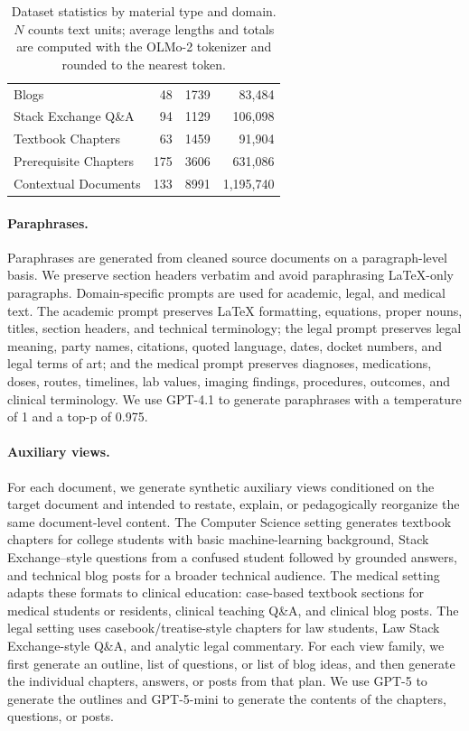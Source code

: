 \begin{table}[t]
\begin{tabular}{@{}lrrr@{}}
Blogs & 48 & 1739 & 83{,}484 \\
Stack Exchange Q\&A & 94 & 1129 & 106{,}098 \\
Textbook Chapters & 63 & 1459 & 91{,}904 \\
Prerequisite Chapters & 175 & 3606 & 631{,}086 \\
Contextual Documents & 133 & 8991 & 1{,}195{,}740 \\
\bottomrule
\end{tabular}
\caption{Dataset statistics by material type and domain. $N$ counts text units; average lengths and totals are computed with the OLMo-2 tokenizer and rounded to the nearest token.}
\label{tab:dataset_artifact_inventory}
\end{table}

\paragraph{Paraphrases.}
Paraphrases are generated from cleaned source documents on a paragraph-level basis.  We preserve section headers verbatim and avoid paraphrasing LaTeX-only paragraphs. Domain-specific prompts are used for academic, legal, and medical text.  The academic prompt preserves LaTeX formatting, equations, proper nouns, titles, section headers, and technical terminology; the legal prompt preserves legal meaning, party names, citations, quoted language, dates, docket numbers, and legal terms of art; and the medical prompt preserves diagnoses, medications, doses, routes, timelines, lab values, imaging findings, procedures, outcomes, and clinical terminology. We use GPT-4.1 to generate paraphrases with a temperature of 1 and a top-p of 0.975.

\paragraph{Auxiliary views.}
For each document, we generate synthetic auxiliary views conditioned on the target document and intended to restate, explain, or pedagogically reorganize the same document-level content.  The Computer Science setting generates textbook chapters for college students with basic machine-learning background, Stack Exchange--style questions from a confused student followed by grounded answers, and technical blog posts for a broader technical audience.  The medical setting adapts these formats to clinical education: case-based textbook sections for medical students or residents, clinical teaching Q\&A, and clinical blog posts.  The legal setting uses casebook/treatise-style chapters for law students, Law Stack Exchange-style Q\&A, and analytic legal commentary.  For each view family, we first generate an outline, list of questions, or list of blog ideas, and then generate the individual chapters, answers, or posts from that plan. We use GPT-5 to generate the outlines and GPT-5-mini to generate the contents of the chapters, questions, or posts.

